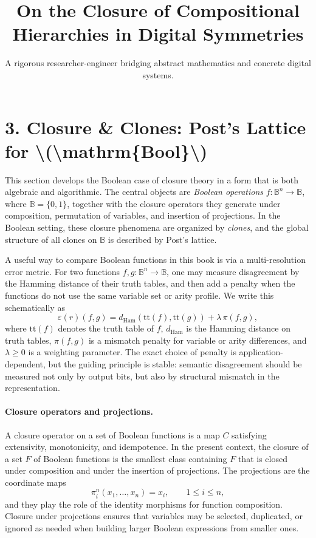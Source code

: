 \documentclass[11pt]{article}
\title{On the Closure of Compositional Hierarchies in Digital Symmetries}
\author{A rigorous researcher-engineer bridging abstract mathematics and concrete digital systems.}
\begin{document}
\section*{3. Closure \& Clones: Post’s Lattice for \textbackslash{}(\textbackslash{}mathrm\{Bool\}\textbackslash{})}

This section develops the Boolean case of closure theory in a form that is both algebraic and algorithmic. The central objects are \emph{Boolean operations} $f \colon \mathbb{B}^n \to \mathbb{B}$, where $\mathbb{B}=\{0,1\}$, together with the closure operators they generate under composition, permutation of variables, and insertion of projections. In the Boolean setting, these closure phenomena are organized by \emph{clones}, and the global structure of all clones on $\mathbb{B}$ is described by Post's lattice.

A useful way to compare Boolean functions in this book is via a multi-resolution error metric. For two functions $f,g \colon \mathbb{B}^n \to \mathbb{B}$, one may measure disagreement by the Hamming distance of their truth tables, and then add a penalty when the functions do not use the same variable set or arity profile. We write this schematically as
\[
\varepsilon(r)(f,g) = d_{\mathrm{Ham}}(\mathrm{tt}(f),\mathrm{tt}(g)) + \lambda\,\pi(f,g),
\]
where $\mathrm{tt}(f)$ denotes the truth table of $f$, $d_{\mathrm{Ham}}$ is the Hamming distance on truth tables, $\pi(f,g)$ is a mismatch penalty for variable or arity differences, and $\lambda \ge 0$ is a weighting parameter. The exact choice of penalty is application-dependent, but the guiding principle is stable: semantic disagreement should be measured not only by output bits, but also by structural mismatch in the representation.

\paragraph{Closure operators and projections.}
A closure operator on a set of Boolean functions is a map $C$ satisfying extensivity, monotonicity, and idempotence. In the present context, the closure of a set $F$ of Boolean functions is the smallest class containing $F$ that is closed under composition and under the insertion of projections. The projections are the coordinate maps
\[
\pi_i^n(x_1,\dots,x_n)=x_i, \qquad 1\le i\le n,
\]
and they play the role of the identity morphisms for function composition. Closure under projections ensures that variables may be selected, duplicated, or ignored as needed when building larger Boolean expressions from smaller ones.
\end{document}
